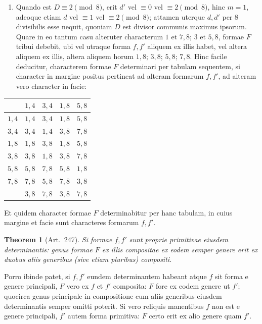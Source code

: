 \documentclass[12pt,a4paper]{article}
\theoremstyle{plain}
\newtheorem{theorem}{Theorem}[section]
\theoremstyle{definition}
\theoremstyle{remark}
\theoremstyle{problemstyle}
\begin{document}
\begin{enumerate}[label=$\arabic*^{\circ}$.]
\item Quando est $D \equiv 2 \pmod{8}$, erit $d'$ vel $\equiv 0$ vel $\equiv 2 \pmod{8}$, hinc $m = 1$, adeoque etiam $d$ vel $\equiv 1$ vel $\equiv 2 \pmod{8}$; attamen uterque $d, d'$ per $8$ divisibilis esse nequit, quoniam $D$ est divisor communis maximus ipsorum. Quare in eo tantum casu alteruter characterum $1 \text{ et } 7,8$; $3 \text{ et } 5,8$, formae $F$ tribui debebit, ubi vel utraque forma $f, f'$ aliquem ex illis habet, vel altera aliquem ex illis, altera aliquem horum $1,8$; $3,8$; $5,8$; $7,8$. Hinc facile deducitur, characterem formae $F$ determinari per tabulam sequentem, si character in margine positus pertineat ad alteram formarum $f, f'$, ad alteram vero character in facie:
\end{enumerate}

\begin{center}
\begin{tabular}{c|cccc}
 & $1,4$ & $3,4$ & $1,8$ & $5,8$ \\
\hline
$1,4$ & $1,4$ & $3,4$ & $1,8$ & $5,8$ \\
$3,4$ & $3,4$ & $1,4$ & $3,8$ & $7,8$ \\
$1,8$ & $1,8$ & $3,8$ & $1,8$ & $5,8$ \\
$3,8$ & $3,8$ & $1,8$ & $3,8$ & $7,8$ \\
$5,8$ & $5,8$ & $7,8$ & $5,8$ & $1,8$ \\
$7,8$ & $7,8$ & $5,8$ & $7,8$ & $3,8$ \\
\hline
 & $3,8$ & $7,8$ & $3,8$ & $7,8$
\end{tabular}
\end{center}

Et quidem character formae $F$ determinabitur per hanc tabulam, in cuius margine et facie sunt characteres formarum $f, f'$.

\begin{theorem}[Art.\ 247]
Si formae $f, f'$ sunt proprie primitivae eiusdem determinantis: genus formae $F$ ex illis compositae ex eodem semper genere erit ex duobus aliis generibus (sive etiam pluribus) compositi.
\end{theorem}

Porro ibinde patet, si $f, f'$ eundem determinantem habeant atque $f$ sit forma e genere principali, $F$ vero ex $f$ et $f'$ composita: $F$ fore ex eodem genere ut $f'$; quocirca genus principale in compositione cum aliis generibus eiusdem determinantis semper omitti poterit. Si vero reliquis manentibus $f$ non est e genere principali, $f'$ autem forma primitiva: $F$ certo erit ex alio genere quam $f'$.
\end{document}
